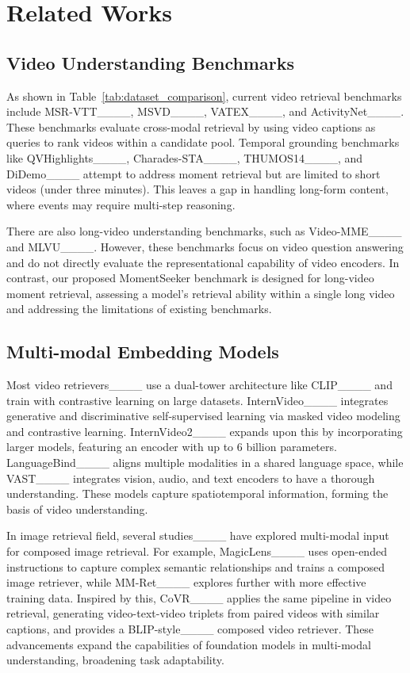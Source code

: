 \section{Related Works}
\subsection{Video Understanding Benchmarks}
As shown in Table~\ref{tab:dataset_comparison}, current video retrieval benchmarks include MSR-VTT____, MSVD____, VATEX____, and ActivityNet____. These benchmarks evaluate cross-modal retrieval by using video captions as queries to rank videos within a candidate pool. Temporal grounding benchmarks like QVHighlights____, Charades-STA____, THUMOS14____, and DiDemo____ attempt to address moment retrieval but are limited to short videos (under three minutes). This leaves a gap in handling long-form content, where events may  require multi-step reasoning. 

There are also long-video understanding benchmarks, such as Video-MME____ and MLVU____. However, these benchmarks focus on video question answering and do not directly evaluate the representational capability of video encoders. In contrast, our proposed MomentSeeker benchmark is designed for long-video moment retrieval, assessing a model's retrieval ability within a single long video and addressing the limitations of existing benchmarks.

\subsection{Multi-modal Embedding Models}

Most video retrievers____ use a dual-tower architecture like CLIP____ and train with contrastive learning on large datasets. InternVideo____ integrates generative and discriminative self-supervised learning via masked video modeling and contrastive learning. InternVideo2____ expands upon this by incorporating larger models, featuring an encoder with up to 6 billion parameters. LanguageBind____ aligns multiple modalities in a shared language space, while VAST____ integrates vision, audio, and text encoders to have a thorough understanding. These models capture spatiotemporal information, forming the basis of video understanding.

In image retrieval field, several studies____ have explored multi-modal input for composed image retrieval. For example,  MagicLens____ uses open-ended instructions to capture complex semantic relationships and trains a composed image retriever, while MM-Ret____ explores further with more effective training data. Inspired by this, CoVR____ applies the same pipeline in video retrieval, generating video-text-video triplets from paired videos with similar captions, and provides a BLIP-style____ composed video retriever. These advancements expand the capabilities of foundation models in multi-modal understanding, broadening task adaptability.

